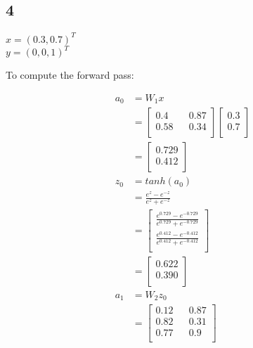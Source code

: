 \documentclass[a4paper]{article}
\begin{document}
\subsection*{4}

$x = (0.3, 0.7)^T$\\
$y = (0, 0, 1)^T$

To compute the forward pass:

\begin{align*}
    a_{0} &= W_{1}x \\
    &= \left[\begin{matrix}     
        0.4 && 0.87 \\
        0.58 && 0.34 \\
       \end{matrix} \right] 
       \left[\begin{matrix}
        0.3  \\
        0.7 \\
       \end{matrix} \right] \\
    &= \left[\begin{matrix}
        0.729  \\
        0.412 \\
       \end{matrix} \right] \\
    z_{0} &= tanh(a_{0}) \\
    &= \frac{e^{z} - e^{-z}}{e^{z} + e^{-z}} \\
    &= \left[\begin{matrix}
        \frac{e^{0.729} - e^{-0.729}}{e^{0.729} + e^{-0.729}}  \\
        \frac{e^{0.412} - e^{-0.412}}{e^{0.412} + e^{-0.412}} \\
       \end{matrix} \right] \\
    &= \left[\begin{matrix}
        0.622  \\
        0.390  \\
       \end{matrix} \right] \\
    a_{1} &= W_{2}z_{0} \\
    &= \left[\begin{matrix}     
        0.12 && 0.87 \\
        0.82 && 0.31 \\
        0.77 && 0.9 \\
       \end{matrix} \right] 

\end{align*}
\end{document}
